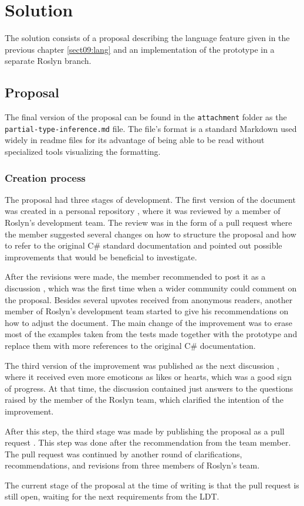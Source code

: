 \chapter{Solution}

The solution consists of a proposal describing the language feature given in the previous chapter \ref{sect09:lang} and an implementation of the prototype in a separate Roslyn branch.

\section{Proposal}

The final version of the proposal can be found in the \texttt{attachment} folder as the \texttt{partial-type-inference.md} file. 
The file’s format is a standard Markdown used widely in readme files for its advantage of being able to be read without specialized tools visualizing the formatting.

\subsection{Creation process}

The proposal had three stages of development. 
The first version of the document was created in a personal repository \cite{online:personalRepo}, where it was reviewed by a member of Roslyn's development team. 
The review was in the form of a pull request \cite{online:personalPull} where the member suggested several changes on how to structure the proposal and how to refer to the original C\# standard documentation and pointed out possible improvements that would be beneficial to investigate.
\par
After the revisions were made, the member recommended to post it as a discussion \cite{online:discussion1}, which was the first time when a wider community could comment on the proposal. 
Besides several upvotes received from anonymous readers, another member of Roslyn's development team started to give his recommendations on how to adjust the document. 
The main change of the improvement was to erase most of the examples taken from the tests made together with the prototype and replace them with more references to the original C\# documentation.
\par
The third version of the improvement was published as the next discussion \cite{online:discussion2}, where it received even more emoticons as likes or hearts, which was a good sign of progress. 
At that time, the discussion contained just answers to the questions raised by the member of the Roslyn team, which clarified the intention of the improvement.
\par
After this step, the third stage was made by publishing the proposal as a pull request \cite{online:pull2}. 
This step was done after the recommendation from the team member. 
The pull request was continued by another round of clarifications, recommendations, and revisions from three members of Roslyn's team.
\par
The current stage of the proposal at the time of writing is that the pull
request is still open, waiting for the next requirements from the \ac{LDT}.


